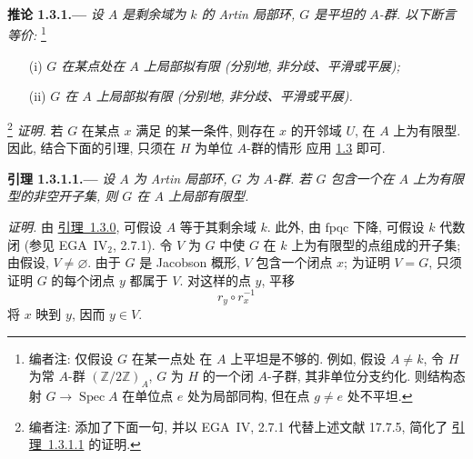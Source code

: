 
\medskip
{}\label{cor:sga3-VIB-1.3.1}%
\noindent\textbf{推论 1.3.1.---}
\emph{设 \(A\) 是剩余域为 \(k\) 的 Artin 局部环,
\(G\) 是平坦的 \(A\)-群. 以下断言等价:}%
\footnote{\label{note:sga3-VIB-8}编者注: 仅假设 \(G\) 在某一点处
在 \(A\) 上平坦是不够的. 例如, 假设 \(A\ne k\),
令 \(H\) 为常 \(A\)-群 \((\mathbb Z/2\mathbb Z)_A\),
\(G\) 为 \(H\) 的一个闭 \(A\)-子群,
其非单位分支约化. 则结构态射 \(G\to\operatorname{Spec}A\)
在单位点 \(e\) 处为局部同构, 但在点 \(g\ne e\) 处不平坦.}
\begin{enumerate}
\item[\textup{\SGAInlineRefTarget{cor:sga3-VIB-1.3.1:item:i}(i)}]
  \emph{\(G\) 在某点处在 \(A\) 上局部拟有限
  (分别地, 非分歧、平滑或平展);}
\item[\textup{\SGAInlineRefTarget{cor:sga3-VIB-1.3.1:item:ii}(ii)}]
  \emph{\(G\) 在 \(A\) 上局部拟有限
  (分别地, 非分歧、平滑或平展).}
\end{enumerate}

\footnote{\label{note:sga3-VIB-9}编者注: 添加了下面一句,
并以 EGA~IV, 2.7.1 代替上述文献 17.7.5,
简化了 \hyperref[lem:sga3-VIB-1.3.1.1]{引理~1.3.1.1} 的证明.}
\emph{证明.}
若 \(G\) 在某点 \(x\) 满足
\textup{} 的某一条件,
则存在 \(x\) 的开邻域 \(U\), 在 \(A\) 上为有限型.
因此, 结合下面的引理, 只须在 \(H\) 为单位 \(A\)-群的情形
应用 \hyperref[prop:sga3-VIB-1.3]{1.3} 即可.

\medskip
{}\label{lem:sga3-VIB-1.3.1.1}%
\noindent\textbf{引理 1.3.1.1.---}
\emph{设 \(A\) 为 Artin 局部环, \(G\) 为 \(A\)-群.
若 \(G\) 包含一个在 \(A\) 上为有限型的非空开子集,
则 \(G\) 在 \(A\) 上局部有限型.}

\emph{证明.}
由 \hyperref[lem:sga3-VIB-1.3.0]{引理~1.3.0},
可假设 \(A\) 等于其剩余域 \(k\).
此外, 由 \(\mathrm{fpqc}\) 下降, 可假设 \(k\) 代数闭
(参见 EGA~IV\(_2\), 2.7.1).
令 \(V\) 为 \(G\) 中使 \(G\) 在 \(k\) 上为有限型的点组成的开子集;
由假设, \(V\ne\varnothing\). 由于 \(G\) 是 Jacobson 概形,
\(V\) 包含一个闭点 \(x\); 为证明 \(V=G\),
只须证明 \(G\) 的每个闭点 \(y\) 都属于 \(V\).
对这样的点 \(y\), 平移
\[
  r_y\circ r_x^{-1}
\]
将 \(x\) 映到 \(y\), 因而 \(y\in V\).

